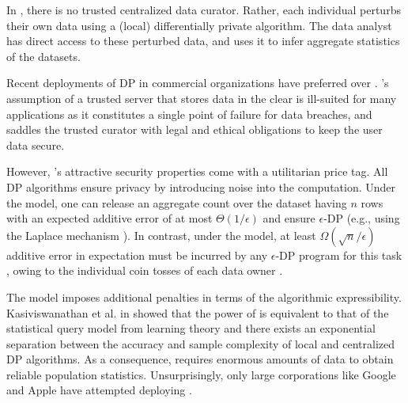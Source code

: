 In \ldp, there is no trusted centralized data curator. Rather, each individual perturbs their own data using a (local) differentially private algorithm. The data analyst has direct access to these perturbed data, and uses it to infer aggregate statistics of the datasets. %


Recent deployments of DP in commercial organizations \cite{Rappor1, Apple} have preferred  \ldp over \cdp. \cdp's assumption of a trusted server that stores data in the clear is ill-suited for many applications as it constitutes a single point of failure for data breaches, and saddles the trusted curator with legal and ethical obligations to keep the user data secure. %
  

However, \ldp's attractive security properties come with a utilitarian price tag. All DP algorithms ensure privacy by introducing noise into the computation. Under the \cdp model, one can release an aggregate count over the dataset having $n$ rows with an expected additive error of at most $\Theta(1/\epsilon)$ and ensure $\epsilon$-DP (e.g., using the Laplace mechanism \cite{dwork}). In contrast, under the \ldp model, at least $\Omega(\sqrt{n}/\epsilon)$ additive error in expectation must be incurred by any $\epsilon$-DP program for this task \cite{error1,error2,error3}, owing to the individual coin tosses of each data owner \cite{Prochlo,Rappor1,Rappor2,LDP1}. %


The \ldp model imposes additional penalties in terms of the  algorithmic expressibility.  Kasiviswanathan et al. in \cite{Kasivi} showed that the power of \ldp is equivalent to that of the statistical query model \cite{SQ1} from learning theory and there exists an exponential separation between the accuracy and sample complexity of local and centralized DP algorithms.  As a consequence, \ldp requires enormous amounts of data to obtain reliable population statistics. Unsurprisingly, only large corporations  like Google \cite{Rappor1,Rappor2,Prochlo} and Apple \cite{Apple} have attempted deploying \ldp.
 
